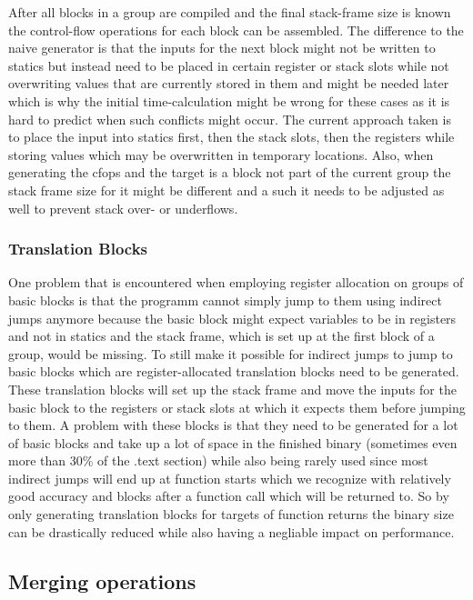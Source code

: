 \documentclass[course=eragp]{aspdoc}
\begin{document}
\par

After all blocks in a group are compiled and the final stack-frame size is known the control-flow operations for each block can be assembled.
The difference to the naive generator is that the inputs for the next block might not be written to statics but instead need to be placed in certain register or stack slots
while not overwriting values that are currently stored in them and might be needed later which is why the initial time-calculation might be wrong for these cases as it is hard to predict when such
conflicts might occur. The current approach taken is to place the input into statics first, then the stack slots, then the registers while storing values which may be overwritten in temporary locations.
Also, when generating the cfops and the target is a block not part of the current group the stack frame size for it might be different and a such it needs to be adjusted as well to prevent stack over- or underflows.



\subsubsection{Translation Blocks}
One problem that is encountered when employing register allocation on groups of basic blocks is that the programm cannot simply jump to them using indirect jumps anymore because the basic block might expect variables to be in registers
and not in statics and the stack frame, which is set up at the first block of a group, would be missing. To still make it possible for indirect jumps to jump to basic blocks which are register-allocated translation blocks need to be generated.
These translation blocks will set up the stack frame and move the inputs for the basic block to the registers or stack slots at which it expects them before jumping to them.
A problem with these blocks is that they need to be generated for a lot of basic blocks and take up a lot of space in the finished binary (sometimes even more than 30\% of the .text section) while also being rarely used
since most indirect jumps will end up at function starts which we recognize with relatively good accuracy and blocks after a function call which will be returned to.
So by only generating translation blocks for targets of function returns the binary size can be drastically reduced while also having a negliable impact on performance.
\subsection{Merging operations}
\end{document}
